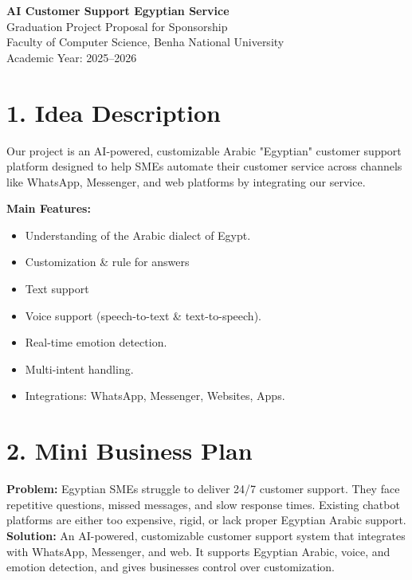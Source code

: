 \documentclass[12pt,a4paper]{article}
\begin{document}
\begin{center}
    {\Huge \textbf{AI Customer Support Egyptian Service}}\\[0.5cm]
    {\Large Graduation Project Proposal for Sponsorship}\\[0.3cm]
    {\large Faculty of Computer Science, Benha National University}\\[0.3cm]
    {\large Academic Year: 2025–2026}\\[1cm]
\end{center}

\section*{1. Idea Description}
Our project is an AI-powered, customizable Arabic "Egyptian" customer support platform designed to help SMEs automate their customer service across channels like WhatsApp, Messenger, and web platforms by integrating our service.

\textbf{Main Features:}
\begin{itemize}[noitemsep]
    \item Understanding of the Arabic dialect of Egypt.
    \item Customization \& rule for answers
    \item Text support
    \item Voice support (speech-to-text \& text-to-speech).
    \item Real-time emotion detection.
    \item Multi-intent handling.
    \item Integrations: WhatsApp, Messenger, Websites, Apps.
\end{itemize}

\section*{2. Mini Business Plan}
\textbf{Problem:} Egyptian SMEs struggle to deliver 24/7 customer support. They face repetitive questions, missed 
messages, and slow response times. Existing chatbot platforms are either too expensive, rigid, or 
lack proper Egyptian Arabic support. \\

\textbf{Solution:} An AI-powered, customizable customer support system that integrates with WhatsApp, 
Messenger, and web. It supports Egyptian Arabic, voice, and emotion detection, and gives 
businesses control over customization. \\
\end{document}
